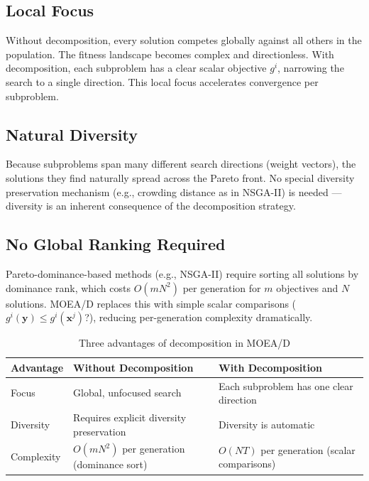 \documentclass[12pt,a4paper]{article}
\begin{document}
\subsection{Local Focus}

Without decomposition, every solution competes globally against all others in the population. The fitness landscape becomes complex and directionless. With decomposition, each subproblem has a clear scalar objective $g^i$, narrowing the search to a single direction. This local focus accelerates convergence per subproblem.

\subsection{Natural Diversity}

Because subproblems span many different search directions (weight vectors), the solutions they find naturally spread across the Pareto front. No special diversity preservation mechanism (e.g., crowding distance as in NSGA-II) is needed --- diversity is an inherent consequence of the decomposition strategy.

\subsection{No Global Ranking Required}

Pareto-dominance-based methods (e.g., NSGA-II) require sorting all solutions by dominance rank, which costs $O(mN^2)$ per generation for $m$ objectives and $N$ solutions. MOEA/D replaces this with simple scalar comparisons ($g^i(\mathbf{y}) \leq g^i(\mathbf{x}^j)$?), reducing per-generation complexity dramatically.

\begin{table}[H]
\centering
\caption{Three advantages of decomposition in MOEA/D}
\label{tab:advantages}
\renewcommand{\arraystretch}{1.4}
\begin{tabular}{p{3cm} p{5.5cm} p{5cm}}
\toprule
\textbf{Advantage} & \textbf{Without Decomposition} & \textbf{With Decomposition} \\
\midrule
Focus & Global, unfocused search & Each subproblem has one clear direction \\
Diversity & Requires explicit diversity preservation & Diversity is automatic \\
Complexity & $O(mN^2)$ per generation (dominance sort) & $O(NT)$ per generation (scalar comparisons) \\
\bottomrule
\end{tabular}
\end{table}
\end{document}
